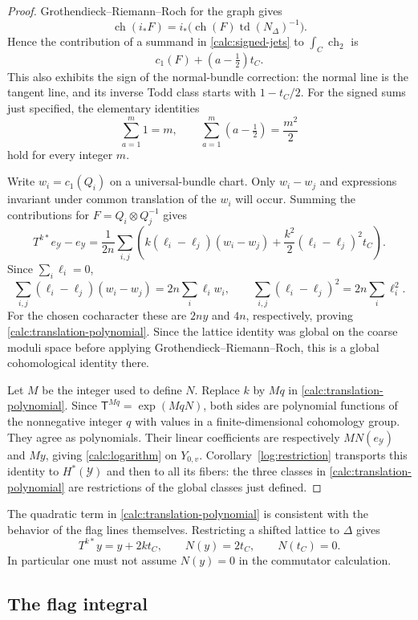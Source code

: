 \begin{proof}
Grothendieck--Riemann--Roch for the graph \cite[Section~15.2]{Fulton1998} gives
\[
 \operatorname{ch}(i_*F)
   =i_*\bigl(\operatorname{ch}(F)\operatorname{td}(N_\Delta)^{-1}\bigr).
\]
Hence the contribution of a summand in \eqref{calc:signed-jets} to
$\int_C\operatorname{ch}_2$ is
\[
 c_1(F)+(a-\tfrac12)t_C.
\]
This also exhibits the sign of the normal-bundle correction: the normal
line is the tangent line, and its inverse Todd class starts with
$1-t_C/2$.
For the signed sums just specified, the elementary identities
\[
 \sum_{a=1}^{m}1=m,
 \qquad
 \sum_{a=1}^{m}(a-\tfrac12)=\frac{m^2}{2}
\]
hold for every integer $m$.

Write $w_i=c_1(Q_i)$ on a universal-bundle chart.  Only $w_i-w_j$ and
expressions invariant under common translation of the $w_i$ will occur.
Summing the contributions for $F=Q_i\otimes Q_j^{-1}$ gives
\[
 T^{k*}e_{\mathcal Y}-e_{\mathcal Y}
 =\frac1{2n}\sum_{i,j}
   \left(k(\ell_i-\ell_j)(w_i-w_j)
       +\frac{k^2}{2}(\ell_i-\ell_j)^2t_C\right).
\]
Since $\sum_i\ell_i=0$,
\[
 \sum_{i,j}(\ell_i-\ell_j)(w_i-w_j)=2n\sum_i\ell_iw_i,
 \qquad
 \sum_{i,j}(\ell_i-\ell_j)^2=2n\sum_i\ell_i^2.
\]
For the chosen cocharacter these are $2ny$ and $4n$, respectively, proving
\eqref{calc:translation-polynomial}.  Since the lattice identity was global
on the coarse moduli space before applying Grothendieck--Riemann--Roch,
this is a global cohomological identity there.

Let $M$ be the integer used to define $N$.  Replace $k$ by $Mq$ in
\eqref{calc:translation-polynomial}.  Since $\mathsf T^{Mq}=\exp(MqN)$,
both sides are polynomial functions of the nonnegative integer $q$ with
values in a finite-dimensional cohomology group.  They agree as
polynomials.  Their linear coefficients are respectively $MN(e_{\mathcal
Y})$ and $My$, giving \eqref{calc:logarithm} on $Y_{0,v}$.
Corollary~\ref{log:restriction} transports this identity to
$H^*(\mathcal Y)$ and then to all its fibers: the three classes in
\eqref{calc:translation-polynomial} are restrictions of the global classes
just defined.
\end{proof}

The quadratic term in \eqref{calc:translation-polynomial} is consistent
with the behavior of the flag lines themselves.  Restricting a shifted
lattice to $\Delta$ gives
\[
 T^{k*}y=y+2kt_C,
 \qquad N(y)=2t_C,
 \qquad N(t_C)=0.
\]
In particular one must not assume $N(y)=0$ in the commutator calculation.

\subsection{The flag integral}

